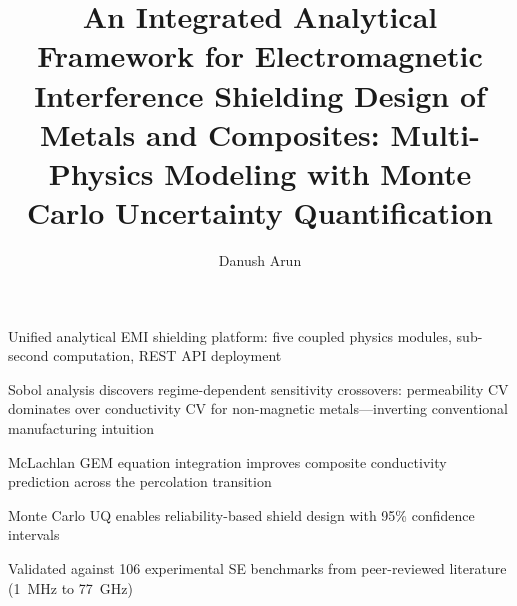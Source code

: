 \documentclass[review,3p,authoryear]{elsarticle}
\begin{document}
\begin{frontmatter}

\title{An Integrated Analytical Framework for Electromagnetic Interference Shielding Design of Metals and Composites: Multi-Physics Modeling with Monte Carlo Uncertainty Quantification}

\author[inst1]{Danush Arun}

\begin{highlights}
\item Unified analytical EMI shielding platform: five coupled physics modules, sub-second computation, REST API deployment
\item Sobol analysis discovers regime-dependent sensitivity crossovers: permeability CV dominates over conductivity CV for non-magnetic metals---inverting conventional manufacturing intuition
\item McLachlan GEM equation integration improves composite conductivity prediction across the percolation transition
\item Monte Carlo UQ enables reliability-based shield design with 95\% confidence intervals
\item Validated against 106 experimental SE benchmarks from peer-reviewed literature (1~MHz to 77~GHz)
\end{highlights}


\end{frontmatter}
\end{document}

